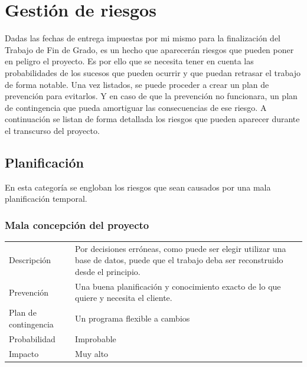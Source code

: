 \section{Gesti\'{o}n de riesgos}
Dadas las fechas de entrega impuestas por mi mismo para la finalizaci\'{o}n del Trabajo de Fin de Grado, es un hecho que
aparecerán riesgos que pueden poner en peligro el proyecto. Es por ello que se necesita tener en cuenta las probabilidades de los sucesos que 
pueden ocurrir y que puedan retrasar el trabajo de forma notable. Una vez
listados, se puede proceder a crear un plan de prevención para evitarlos. Y en caso de que la prevención no
funcionara, un plan de contingencia que pueda amortiguar las consecuencias de ese riesgo. A continuación
se listan de forma detallada los riesgos que pueden aparecer durante el transcurso del proyecto.

\subsection{Planificaci\'{o}n}
En esta categor\'{i}a se engloban los riesgos que sean causados por una mala planificaci\'{o}n temporal.

\subsubsection{Mala concepci\'{o}n del proyecto}
\begin{table}[ht]
    \begin{center}
       \begin{tabular}{l p{8cm}}
           Descripci\'{o}n                 & Por decisiones erróneas, como puede ser elegir utilizar una
           base de datos, puede que el trabajo deba ser reconstruido desde el principio. \\
           Prevenci\'{o}n                  & Una buena planificación y conocimiento exacto de lo que quiere y necesita el cliente. \\ 
           Plan de contingencia            & Un programa flexible a cambios \\
           Probabilidad                    & Improbable \\
           Impacto                         & Muy alto\\
        \end{tabular}
    \end{center}
    
\end{table}

